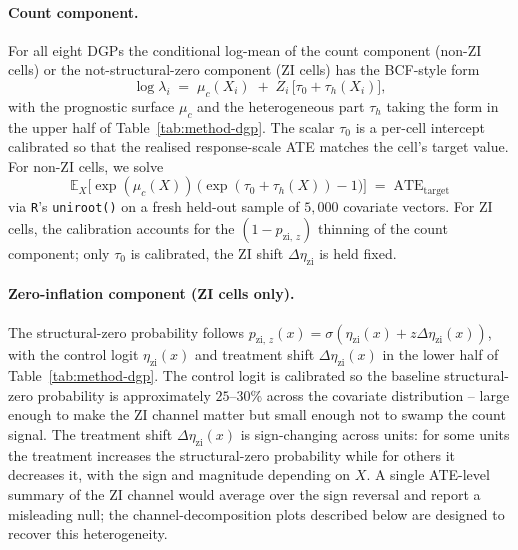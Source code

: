 \documentclass[11pt]{article}
\theoremstyle{plain}
\theoremstyle{definition}
\theoremstyle{remark}
\newcommand{\E}{\mathbb{E}}
\newcommand{\pzi}[1][z]{p_{\mathrm{zi},\,#1}}
\newcommand{\etazi}{\eta_{\mathrm{zi}}}
\newcommand{\Detazi}{\Delta\etazi}
\begin{document}
\paragraph{Count component.}
For all eight DGPs the conditional log-mean of the count component
(non-ZI cells) or the not-structural-zero component (ZI cells) has
the BCF-style form
\begin{equation}
  \log \lambda_i \;=\; \mu_c(X_i) \;+\; Z_i\,\bigl[\tau_0 + \tau_h(X_i)\bigr],
  \label{eq:method-loglambda}
\end{equation}
with the prognostic surface $\mu_c$ and the heterogeneous part
$\tau_h$ taking the form in the upper half of
Table~\ref{tab:method-dgp}. The scalar $\tau_0$ is a per-cell
intercept calibrated so that the realised response-scale ATE matches
the cell's target value. For non-ZI cells, we solve
\begin{equation}
  \E_{X}\!\bigl[\exp(\mu_c(X))\,\bigl(\exp(\tau_0 + \tau_h(X)) - 1\bigr)\bigr]
  \;=\; \mathrm{ATE}_{\mathrm{target}}
  \label{eq:method-tau0-calib}
\end{equation}
via \texttt{R}'s \texttt{uniroot()} on a fresh held-out sample of
$5{,}000$ covariate vectors. For ZI cells, the calibration accounts
for the $(1 - \pzi)$ thinning of the count component; only $\tau_0$
is calibrated, the ZI shift $\Detazi$ is held fixed.

\paragraph{Zero-inflation component (ZI cells only).}
The structural-zero probability follows $\pzi(x) = \sigma(\etazi(x) +
z \Detazi(x))$, with the control logit $\etazi(x)$ and treatment
shift $\Detazi(x)$ in the lower half of Table~\ref{tab:method-dgp}.
The control logit is calibrated so the baseline structural-zero
probability is approximately $25$--$30\%$ across the covariate
distribution -- large enough to make the ZI channel matter but small
enough not to swamp the count signal. The treatment shift
$\Detazi(x)$ is sign-changing across units: for some units the
treatment increases the structural-zero probability while for others
it decreases it, with the sign and magnitude depending on $X$. A
single ATE-level summary of the ZI channel would average over the
sign reversal and report a misleading null; the channel-decomposition
plots described below are designed to recover this heterogeneity.
\end{document}
